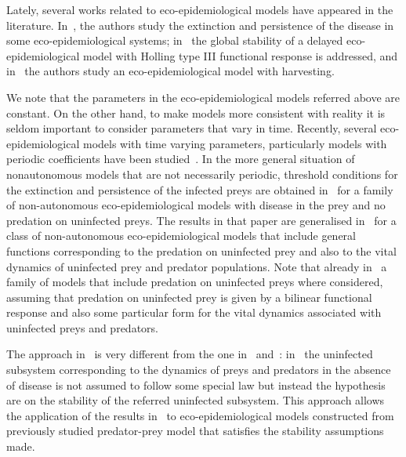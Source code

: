 \documentclass[reqno]{amsart}
\begin{document}
{Lately, several works related to eco-epidemiological models have appeared in the literature. In~\cite{Chakraborty-Das-Haldar-Kar-2015}, the authors study the extinction and persistence of the disease in some eco-epidemiological systems; in~\cite{Bai-Xo-2018} the global stability of a delayed eco-epidemiological model with Holling type III functional response is addressed, and in~\cite{Purnomo-Darti-Suryanto-2017} the authors study an eco-epidemiological model with harvesting.}

{We note that the parameters in the eco-epidemiological models referred above are constant. On the other hand, to make models more consistent with reality it is seldom important to consider parameters that vary in time. Recently, several eco-epidemiological models with time varying parameters, particularly models with periodic coefficients have been studied~\cite{Dobson-QRV-1988, Friend-H-2002, Koopmans-Wilbrink-Conyn-Natrop-Nat-Vennema-Lancet-2004, Krebs-Blackwell-Scientific-Publishers-1978, Niu-Zhang-Teng-AMM-2011,Jesus-Silva-Vilarinho-preprint1-2020}. In the more general situation of nonautonomous models that are not necessarily periodic, threshold conditions for the extinction and persistence of the infected preys are obtained in~\cite{Niu-Zhang-Teng-AMM-2011} for a family of non-autonomous eco-epidemiological models with disease in the prey and no predation on uninfected preys. The results in that paper are generalised in~\cite{Jesus-Silva-Vilarinho-preprint2-2020} for a class of non-autonomous eco-epidemiological models that
include general functions corresponding to the predation on uninfected prey and also to the vital dynamics of uninfected prey and predator populations. Note that already in~\cite{Lu-Wang-Liu-DCDS-B-2018} a family of models that include predation on uninfected preys where considered, assuming that predation on uninfected prey is given by a bilinear functional response and also some particular form for the vital dynamics associated with uninfected preys and predators.}

{The approach in~\cite{Jesus-Silva-Vilarinho-preprint2-2020} is very different from the one in~\cite{Niu-Zhang-Teng-AMM-2011} and~\cite{Lu-Wang-Liu-DCDS-B-2018}: in~\cite{Jesus-Silva-Vilarinho-preprint2-2020} the uninfected subsystem corresponding to the dynamics of preys and predators in the absence of disease is not assumed to follow some special law but instead the hypothesis are on the stability of the referred uninfected subsystem. This approach allows the application of the results in~\cite{Jesus-Silva-Vilarinho-preprint2-2020} to eco-epidemiological models constructed from previously studied predator-prey model that satisfies the stability assumptions made.}
\end{document}
